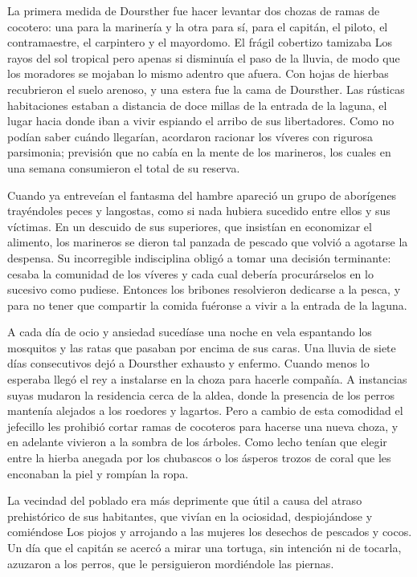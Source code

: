\documentclass[10pt,twoside,openright]{memoir}
\begin{document}
La primera medida de Doursther fue
hacer levantar dos chozas de ramas de cocotero: una para la marinería y
la otra para sí, para el capitán, el piloto, el contramaestre, el
carpintero y el mayordomo. El frágil cobertizo tamizaba Los rayos del
sol tropical pero apenas si disminuía el paso de la lluvia, de modo que
los moradores se mojaban lo mismo adentro que afuera. Con hojas de
hierbas recubrieron el suelo arenoso, y una estera fue la cama de
Doursther. Las rústicas habitaciones estaban a distancia de
 doce millas de la entrada de la
laguna, el lugar hacia donde iban a vivir espiando el arribo de sus
libertadores. Como no podían saber cuándo llegarían, acordaron racionar
los víveres con rigurosa parsimonia; previsión que no cabía en la mente
de los marineros, los cuales en una semana consumieron el total de su
reserva.

Cuando ya entreveían el fantasma del hambre apareció un grupo de
aborígenes trayéndoles peces y langostas, como si nada hubiera sucedido
entre ellos y sus víctimas. En un descuido de sus superiores, que
insistían en economizar el alimento, los
marineros se dieron tal panzada de
pescado que volvió a agotarse la despensa. Su incorregible indisciplina
obligó a tomar una decisión terminante: cesaba la comunidad de los
víveres y cada cual debería procurárselos en lo sucesivo como pudiese.
Entonces los bribones resolvieron dedicarse a la pesca, y para no tener
que compartir la comida fuéronse a vivir a la entrada de la laguna.

A cada día de ocio y ansiedad sucedíase una noche en vela espantando los
mosquitos y las ratas que pasaban por encima de sus caras. Una lluvia de
siete días consecutivos dejó a Doursther exhausto y enfermo. Cuando
menos lo esperaba llegó el rey a instalarse en la choza para hacerle
compañía. A instancias suyas mudaron la residencia cerca de la aldea,
donde la presencia de los perros mantenía alejados a los roedores y
lagartos. Pero a cambio de esta comodidad el jefecillo les prohibió
cortar ramas de cocoteros para hacerse una nueva choza, y en adelante
vivieron a la sombra de los árboles. Como lecho tenían que elegir entre
la hierba anegada por los chubascos o los ásperos trozos de coral que
les enconaban la piel y rompían la ropa.

La vecindad del poblado era más deprimente que útil a causa del atraso
prehistórico de sus habitantes, que vivían en la ociosidad,
despiojándose y comiéndose Los piojos y arrojando a las mujeres los
desechos de pescados y cocos. Un día que el capitán se acercó a mirar
una tortuga, sin intención ni de tocarla, azuzaron a los perros, que le
persiguieron mordiéndole las piernas.
\end{document}

